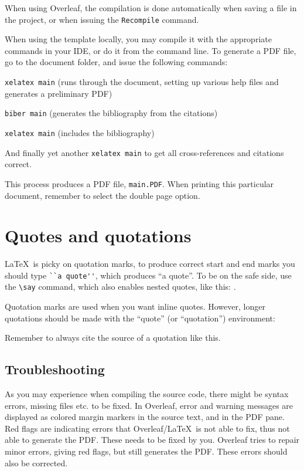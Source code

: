 When using Overleaf, the compilation is done automatically when saving a file in the project, or when issuing the \texttt{Recompile} command.


When using the template locally, you may compile it with the appropriate commands in your IDE, or do it from the command line. To generate a PDF file, go to the document folder, and issue the following commands: 

\begin{compactenum}
\item \verb|xelatex main| (runs through the document, setting up various help files and generates a preliminary PDF)
\item \verb|biber main| (generates the bibliography from the citations)
\item \verb|xelatex main| (includes the bibliography)
\item And finally yet another \verb|xelatex main| to get all cross-references and citations correct.
\end{compactenum}


This process produces a PDF file,
\texttt{main.PDF}. When printing this particular document, remember to select the double page option.

\section{Quotes and quotations}

\LaTeX\ is picky on quotation marks, to produce correct start and end marks you should type \verb|``a quote''|, which produces ``a quote''. To be on the safe side, use the \verb|\say| command, which also enables nested quotes, like this: .

Quotation marks are used when you want inline quotes. However, longer quotations should be made with the ``quote'' (or ``quotation'') environment:
\begin{quote} 
    \lipsum[3-4]
\end{quote}

Remember to always cite the source of a quotation like this.

\subsection{Troubleshooting}

As you may experience when compiling the source code, there might be syntax errors, missing files etc. to be fixed. In Overleaf, error and warning messages are displayed as colored margin markers in the source text, and in the PDF pane. Red flags are indicating errors that Overleaf/\LaTeX\ is not able to fix, thus not able to generate the PDF. These needs to be fixed by you. Overleaf tries to repair minor errors, giving red flags, but still generates the PDF. These errors should also be corrected.

